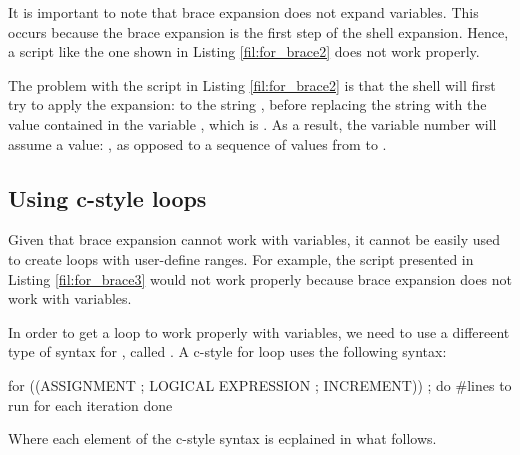 It is important to note that brace expansion does not expand  variables. This occurs because the brace expansion is the first step of the shell expansion. Hence, a script like the one shown in Listing \ref{fil:for_brace2} does not work properly.

The problem with the script in Listing \ref{fil:for_brace2} is that the shell will first try to apply the expansion:  to the string , before replacing the string  with the value contained in the variable , which is . As a result, the variable number will assume a value: , as opposed to a sequence of values from  to .

\subsection{Using c-style  loops}

Given that brace expansion cannot work with variables, it cannot be easily used to create loops with user-define ranges. For example, the script presented in Listing \ref{fil:for_brace3} would not work properly because brace expansion does not work with variables.


In order to get a  loop to work properly with variables, we need to use a differeent type of syntax for , called . A c-style for loop uses the following syntax:
\begin{command_line}[Bash]
for ((ASSIGNMENT ; LOGICAL EXPRESSION ; INCREMENT)) ; do
    #lines to run for each iteration
done    
\end{command_line}
Where each element of the c-style syntax is ecplained in what follows.

